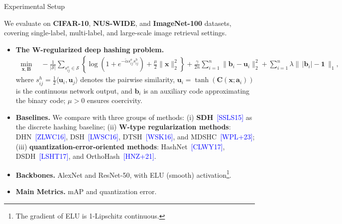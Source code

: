 \documentclass[mathserif,compress,override,9pt]{beamer}
\numberwithin{equation}{section}
\newcommand{\bx}{\bm{x}}
\newcommand{\bb}{\bm{b}}
\newcommand{\ba}{\bm{a}}
\newcommand{\bu}{\bm{u}}
\newcommand{\bB}{\bm{B}}
\newcommand{\bC}{\bm{C}}
\newcommand{\blue}[1]{\textcolor{blue}{#1}}
\theoremstyle{remark}
\begin{document}
\begin{frame}{Experimental Setup}
\small
\vspace{0.1cm}

We evaluate on \textbf{CIFAR-10}, \textbf{NUS-WIDE}, and \textbf{ImageNet-100} datasets, covering single-label, multi-label, and large-scale image retrieval settings.

\begin{itemize}
\item[\blue{$\blacktriangleright$}] \textbf{The W-regularized deep hashing problem.}
{\footnotesize
\begin{align*}
\min_{\bx,\bB}\quad
-\frac{1}{|\mathcal{S}|}\sum_{s^o_{ij}\in\mathcal{S}}
\left\{ 
\log\!\left(1+e^{-\tilde\alpha s^o_{ij}s^h_{ij}}\right)+\frac{\mu}{2}\|\bx\|_2^2 \right\} +\frac{\gamma}{2n}\sum_{i=1}^n\|\bb_i-\bu_i\|_2^2
+\sum_{i=1}^n\lambda\|\,|\bb_i|-\bm{1}\,\|_1,
\end{align*}} where \(s^h_{ij}=\tfrac12\langle\bu_i,\bu_j\rangle\) denotes the
pairwise similarity, \(\bu_i=\tanh(\bC(\bx;\ba_i))\) is the continuous network output,
and \(\bb_i\) is an auxiliary code approximating the binary code; \(\mu>0\) ensures coercivity.

\item[\blue{$\blacktriangleright$}] \textbf{Baselines.} We compare with three groups of methods:
(i) \textbf{SDH}~\blue{[SSLS15]} as the discrete hashing baseline;
(ii) \textbf{W-type regularization methods}: DHN~\blue{[ZLWC16]}, DSH~\blue{[LWSC16]}, DTSH~\blue{[WSK16]}, and MDSHC~\blue{[WPL+23]};
(iii) \textbf{quantization-error-oriented methods}: HashNet~\blue{[CLWY17]}, DSDH~\blue{[LSHT17]}, and OrthoHash~\blue{[HNZ+21]}.
\item[\blue{$\blacktriangleright$}] \textbf{Backbones.} AlexNet and ResNet-50, with ELU (smooth) activation\footnote{The gradient of ELU is 1-Lipschitz continuous.}.
\item[\blue{$\blacktriangleright$}] \textbf{Main Metrics.} mAP and quantization error.
\end{itemize}
\end{frame}


\end{document}
